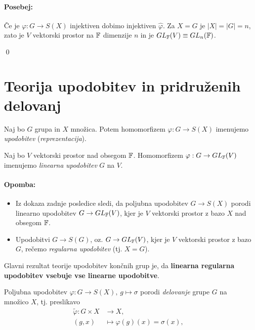 \paragraph{Posebej:} \v Ce je $\varphi: G \to S(X)$ injektiven dobimo injektiven $\hat{\varphi}$. Za $X = G$ je $|X| = |G| = n$, zato je $V$ vektorski
prostor na $\mathbb{F}$ dimenzije $n$ in je $GL_{\mathbb{F}} (V) \equiv GL_n (\mathbb{F})$.

\qed

\section{Teorija upodobitev in pridru\v zenih delovanj}

\begin{defin}
	Naj bo $G$ grupa in $X$ mno\v zica. Potem homomorfizem $\varphi : G \to S(X)$ imenujemo \emph{upodobitev} (\emph{reprezentacija}).
\end{defin}

\begin{defin}
	Naj bo $V$ vektorski prostor nad obsegom $\mathbb{F}$. Homomorfizem $\varphi : G \to GL_{\mathbb{F}}(V)$ imenujemo \emph{linearna upodobitev} $G$ na $V$.
\end{defin}

\paragraph{Opomba:}
\begin{itemize}
	\item{Iz dokaza zadnje posledice sledi, da poljubna upodobitev $G \to S(X)$ porodi linearno upodobitev $G \to GL_{\mathbb{F}}(V)$, kjer je $V$
		vektorski prostor z bazo $X$ nad obsegom $\mathbb{F}$.}
	\item{Upodobitvi $G \to S(G)$, oz. $G \to GL_{\mathbb{F}}(V)$, kjer je $V$ vektorski prostor z bazo $G$, re\v cemo \emph{regularna upodobitev} (tj. $X = G$).}
\end{itemize}

\ni Glavni rezultat teorije upodobitev kon\v cnih grup je, da {\bf linearna regularna upodobitev vsebuje vse linearne upodobitve}.

Poljubna upodobitev $\varphi : G \to S(X),\ g \mapsto \sigma$ porodi \emph{delovanje} grupe $G$ na mno\v zico $X$, tj. preslikavo
\begin{align*}
	\tilde{\varphi}: G \times X &\to X, \\
	(g, x) &\mapsto \varphi(g)(x) = \sigma (x),
\end{align*}

